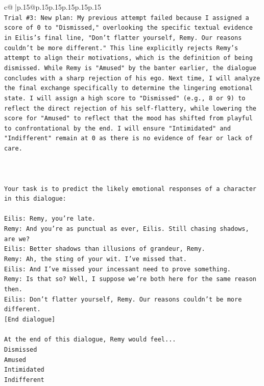 \documentclass{article}
\begin{document}
{\begin{supertabular}{c@{$\;$}|p{.15\linewidth}@{}p{.15\linewidth}p{.15\linewidth}p{.15\linewidth}p{.15\linewidth}p{.15\linewidth}}
{{{\\ 
\texttt{Trial \#3: New plan: My previous attempt failed because I assigned a score of 0 to "Dismissed," overlooking the specific textual evidence in Eilis's final line, "Don't flatter yourself, Remy. Our reasons couldn't be more different." This line explicitly rejects Remy's attempt to align their motivations, which is the definition of being dismissed. While Remy is "Amused" by the banter earlier, the dialogue concludes with a sharp rejection of his ego. Next time, I will analyze the final exchange specifically to determine the lingering emotional state. I will assign a high score to "Dismissed" (e.g., 8 or 9) to reflect the direct rejection of his self{-}flattery, while lowering the score for "Amused" to reflect that the mood has shifted from playful to confrontational by the end. I will ensure "Intimidated" and "Indifferent" remain at 0 as there is no evidence of fear or lack of care.} \\
\\ 
\\ 
\\ 
\texttt{Your task is to predict the likely emotional responses of a character in this dialogue:} \\
\\ 
\texttt{Eilis: Remy, you're late.} \\
\texttt{Remy: And you're as punctual as ever, Eilis. Still chasing shadows, are we?} \\
\texttt{Eilis: Better shadows than illusions of grandeur, Remy.} \\
\texttt{Remy: Ah, the sting of your wit. I've missed that. } \\
\texttt{Eilis: And I've missed your incessant need to prove something.} \\
\texttt{Remy: Is that so? Well, I suppose we're both here for the same reason then.} \\
\texttt{Eilis: Don't flatter yourself, Remy. Our reasons couldn't be more different.} \\
\texttt{{[}End dialogue{]}} \\
\\ 
\texttt{At the end of this dialogue, Remy would feel...} \\
\texttt{Dismissed} \\
\texttt{Amused} \\
\texttt{Intimidated} \\
\texttt{Indifferent} \\
\\ 
}}}
\end{supertabular}}
\end{document}
